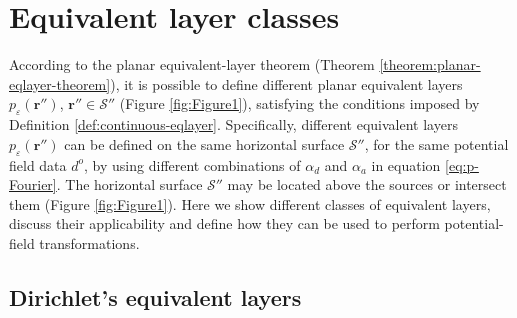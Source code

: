 \section{Equivalent layer classes}
\label{sec:eqlayer_classes}

According to the planar equivalent-layer theorem (Theorem \ref{theorem:planar-eqlayer-theorem}), 
it is possible to define different planar equivalent layers $p_{\varepsilon}(\mathbf{r}'')$, 
$\mathbf{r}'' \in \mathcal{S}''$ (Figure \ref{fig:Figure1}), 
satisfying the conditions imposed by Definition \ref{def:continuous-eqlayer}.
Specifically, different equivalent layers $p_{\varepsilon}(\mathbf{r}'')$ can be defined
on the same horizontal surface $\mathcal{S}''$, for the same potential field data $d^{o}$, 
by using different combinations of $\alpha_{d}$ and $\alpha_{a}$ in equation \ref{eq:p-Fourier}. 
The horizontal surface $\mathcal{S}''$ may be located above the sources 
or intersect them (Figure \ref{fig:Figure1}).
Here we show different classes of equivalent layers, discuss their applicability and define how they 
can be used to perform potential-field transformations.

\subsection{Dirichlet's equivalent layers}

